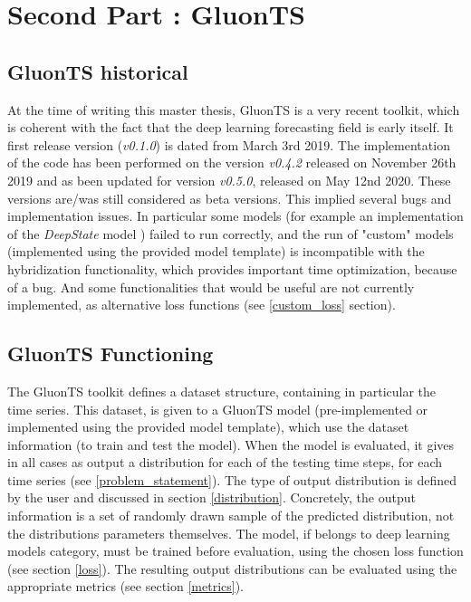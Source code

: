 
\section{Second Part : GluonTS}

\subsection{GluonTS historical}

At the time of writing this master thesis, GluonTS is a very recent toolkit, which is coherent with the fact that the deep learning forecasting field is early itself.
It first release version (\textit{v0.1.0}) is dated from March 3rd 2019.
The implementation of the code has been performed on the version \textit{v0.4.2} released on
November 26th 2019 and as been updated for version \textit{v0.5.0}, released on May 12nd 2020.
These versions are/was still considered as beta versions. This implied several bugs and implementation issues. In particular some models (for example an implementation of the \textit{DeepState} model \cite{deepstate_paper})  failed to run correctly, and the run of "custom" models (implemented using the provided model template) is incompatible with the hybridization functionality, which provides important time optimization, because of a bug. 
And some functionalities that would be useful are not currently implemented, as alternative loss functions (see \ref{custom_loss} section).

\subsection{GluonTS Functioning}

The GluonTS toolkit defines a dataset structure, containing in particular the time series. This dataset, is given to a GluonTS model (pre-implemented or implemented using the provided model template), which use the dataset information (to train and test the model). When the model is evaluated, it gives in all cases as output a distribution for each of the testing time steps, for each time series (see \ref{problem_statement}).
The type of output distribution is defined by the user and discussed in section \ref{distribution}. Concretely, the output information is a set of randomly drawn sample of the predicted distribution,
not the distributions parameters themselves.
The model, if belongs to deep learning models category, must be trained before evaluation, using the chosen loss function (see section \ref{loss}).
The resulting output distributions can be evaluated using the appropriate metrics (see section \ref{metrics}).

